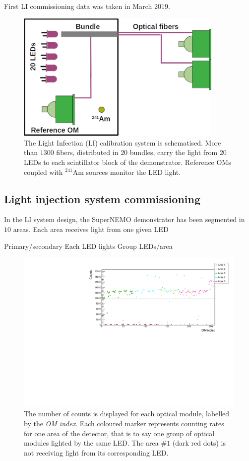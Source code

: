 First LI commissioning data was taken in March 2019.



\begin{figure}[h]
  \centering
  \includegraphics[width=10cm]{commissioning/fig_commissioning/LIS_scheme.pdf}
  \caption{The Light Infection (LI) calibration system is schematised.
    More than $1300$ fibers, distributed in $20$ bundles, carry the light from $20$ LEDs to each scintillator block of the demonstrator.
    Reference OMs coupled with $^{241}$Am sources monitor the LED light.
    \label{fig:LIS_scheme}}
\end{figure}

\subsection{Light injection system commissioning}


In the LI system design, the SuperNEMO demonstrator has been segmented in $10$ areas.
Each area receives light from one given LED

Primary/secondary
Each LED lights
Group LEDs/area

\begin{figure}[h]
  \centering
  \includegraphics[width=15cm]{commissioning/fig_commissioning/LI_1d_counts.pdf}
  \caption{The number of counts is displayed for each optical module, labelled by the \emph{OM index}.
    Each coloured marker represents counting rates for one area of the detector, that is to say one group of optical modules lighted by the same LED.
    The area \#$1$ (dark red dots) is not receiving light from its corresponding LED.
    \label{fig:LI_counts}}
\end{figure}



